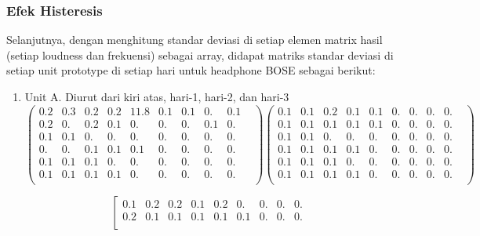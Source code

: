\documentclass[12pt,]{article}
\begin{document}
	\subsubsection{Efek Histeresis}
	 
	Selanjutnya, dengan menghitung standar deviasi di setiap elemen matrix hasil (setiap loudness dan frekuensi) sebagai array,
	didapat matriks standar deviasi di setiap unit prototype di setiap hari untuk headphone BOSE sebagai berikut:
	
	\begin{enumerate}
		\item Unit A. Diurut dari kiri atas, hari-1, hari-2, dan hari-3
		\[ \left( \begin{matrix}
			0.2&0.3&0.2&0.2&11.8&0.1&0.1&0.&0.1\\

			0.2&0.&0.2&0.1&0.&0.&0.&0.1&0.&\\

			0.1&0.1&0.&0.&0.&0.&0.&0.&0.&\\

			0.&0.&0.1&0.1&0.1&0.&0.&0.&0.&\\

			0.1&0.1&0.1&0.&0.&0.&0.&0.&0.&\\

			0.1&0.1&0.1&0.1&0.&0.&0.&0.&0.&\\
		\end{matrix} \right) 
		\left( \begin{matrix}
			0.1&0.1&0.2&0.1&0.1&0.&0.&0.&0.&\\

			0.1&0.1&0.1&0.1&0.1&0.&0.&0.&0.&\\

			0.1&0.1&0.&0.&0.&0.&0.&0.&0.&\\

			0.1&0.1&0.1&0.1&0.&0.&0.&0.&0.&\\

			0.1&0.1&0.1&0.&0.&0.&0.&0.&0.&\\

			0.1&0.1&0.1&0.1&0.&0.&0.&0.&0.&\\
		\end{matrix} \right)
		\]
		
		\[\left[
		\begin{matrix}
			0.1&0.2&0.2&0.1&0.2&0.&0.&0.&0.&\\

			0.2&0.1&0.1&0.1&0.1&0.1&0.&0.&0.&\\


\end{matrix}\]
\end{enumerate}
\end{document}
